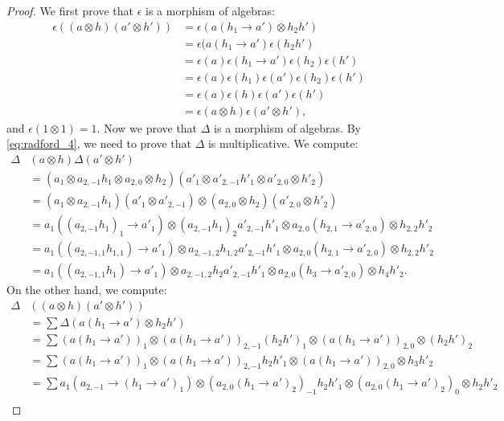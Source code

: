 \documentclass[12pt]{amsproc}
\begin{document}
\begin{proof}
We first prove that $\epsilon$ is a morphism of algebras: 
\begin{align*}
\epsilon((a\otimes h)(a'\otimes h')) & =\epsilon(a(h_{1}\to a')\otimes h_{2}h')\\
 & =\epsilon(a(h_{1}\to a')\epsilon(h_{2}h')\\
 & =\epsilon(a)\epsilon(h_{1}\to a')\epsilon(h_{2})\epsilon(h')\\
 & =\epsilon(a)\epsilon(h_{1})\epsilon(a')\epsilon(h_{2})\epsilon(h')\\
 & =\epsilon(a)\epsilon(h)\epsilon(a')\epsilon(h')\\
 & =\epsilon(a\otimes h)\epsilon(a'\otimes h'),
 \end{align*}
and $\epsilon(1\otimes1)=1$.  Now we prove that $\Delta$ is a morphism of
algebras. By \eqref{eq:radford_4}, we need to prove that $\Delta$ is
multiplicative. We compute:
\begin{align*}
\Delta & (a\otimes h)\Delta(a'\otimes h')\\
 & =(a_{1}\otimes a_{2,-1}h_{1}\otimes a_{2,0}\otimes h_{2})(a'_{1}\otimes a'_{2,-1}h'_{1}\otimes a'_{2,0}\otimes h'_{2})\\
 & =(a_{1}\otimes a_{2,-1}h_{1})(a'_{1}\otimes a'_{2,-1})\otimes(a_{2,0}\otimes h_{2})(a'_{2,0}\otimes h'_{2})\\
 & =a_{1}((a_{2,-1}h_{1})_{1}\to a'_{1})\otimes(a_{2,-1}h_{1})_{2}a'_{2,-1}h'_{1}\otimes a_{2,0}(h_{2,1}\to a'_{2,0})\otimes h_{2,2}h'_{2}\\
 & =a_{1}((a_{2,-1,1}h_{1,1})\to a'_{1})\otimes a_{2,-1,2}h_{1,2}a'_{2,-1}h'_{1}\otimes a_{2,0}(h_{2,1}\to a'_{2,0})\otimes h_{2,2}h'_{2}\\
 & =a_{1}((a_{2,-1,1}h_{1})\to a'_{1})\otimes a_{2,-1,2}h_{2}a'_{2,-1}h'_{1}\otimes a_{2,0}(h_{3}\to a'_{2,0})\otimes h_{4}h'_{2}.\end{align*}
On the other hand, we compute:
\begin{align*}
\Delta & ((a\otimes h)(a'\otimes h'))\\
 & =\sum\Delta(a(h_{1}\to a')\otimes h_{2}h')\\
 & =\sum (a(h_{1}\to a'))_{1}\otimes(a(h_{1}\to a'))_{2,-1}(h_{2}h')_{1}\otimes(a(h_{1}\to a'))_{2,0}\otimes(h_{2}h')_{2}\\
 & =\sum (a(h_{1}\to a'))_{1}\otimes(a(h_{1}\to a'))_{2,-1}h_{2}h'_{1}\otimes(a(h_{1}\to a'))_{2,0}\otimes h_{3}h'_{2}\\
 & =\sum a_{1}(a_{2,-1}\to(h_{1}\to a')_{1})\otimes(a_{2,0}(h_{1}\to a')_{2})_{-1}h_{2}h'_{1}\otimes(a_{2,0}(h_{1}\to a')_{2})_{0}\otimes h_{2}h'_{2}\\

\end{align*}
\end{proof}
\end{document}
